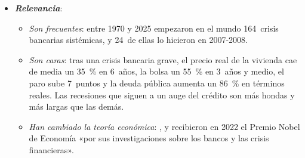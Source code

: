 \documentclass[11pt]{article}
\begin{document}
\begin{itemize}
\item \textbf{\emph{Relevancia}}:
  \begin{itemize}
  \item \emph{Son frecuentes}: entre 1970 y 2025 empezaron en el mundo 164~crisis bancarias sistémicas, y 24~de ellas lo hicieron en 2007-2008\nocite{LaevenValencia2026,LaevenValencia2020}.
  \item \emph{Son caras}: tras una crisis bancaria grave, el precio real de la vivienda cae de media un 35~\% en 6~años, la bolsa un 55~\% en 3~años y medio, el paro sube 7~puntos y la deuda pública aumenta un 86~\% en términos reales\nocite{ReinhartRogoff2009Aftermath}. Las recesiones que siguen a un auge del crédito son más hondas y más largas que las demás\nocite{JordaSchularickTaylor2013Credit}.
  \item \emph{Han cambiado la teoría económica}: ,  y  recibieron en 2022 el Premio Nobel de Economía «por sus investigaciones sobre los bancos y las crisis financieras»\nocite{Nobel2022Bancos}.
  \end{itemize}


\end{itemize}
\end{document}
